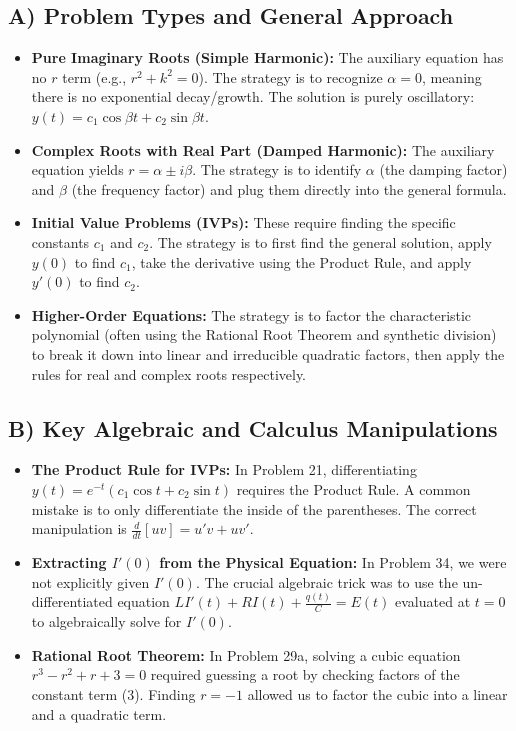 \documentclass[11pt]{article}
\begin{document}
\subsection{A) Problem Types and General Approach}
\begin{itemize}
    \item \textbf{Pure Imaginary Roots (Simple Harmonic):} The auxiliary equation has no $r$ term (e.g., $r^2 + k^2 = 0$). The strategy is to recognize $\alpha = 0$, meaning there is no exponential decay/growth. The solution is purely oscillatory: $y(t) = c_1 \cos \beta t + c_2 \sin \beta t$.
    \item \textbf{Complex Roots with Real Part (Damped Harmonic):} The auxiliary equation yields $r = \alpha \pm i\beta$. The strategy is to identify $\alpha$ (the damping factor) and $\beta$ (the frequency factor) and plug them directly into the general formula.
    \item \textbf{Initial Value Problems (IVPs):} These require finding the specific constants $c_1$ and $c_2$. The strategy is to first find the general solution, apply $y(0)$ to find $c_1$, take the derivative using the Product Rule, and apply $y'(0)$ to find $c_2$.
    \item \textbf{Higher-Order Equations:} The strategy is to factor the characteristic polynomial (often using the Rational Root Theorem and synthetic division) to break it down into linear and irreducible quadratic factors, then apply the rules for real and complex roots respectively.
\end{itemize}

\subsection{B) Key Algebraic and Calculus Manipulations}
\begin{itemize}
    \item \textbf{The Product Rule for IVPs:} In Problem 21, differentiating $y(t) = e^{-t}(c_1 \cos t + c_2 \sin t)$ requires the Product Rule. A common mistake is to only differentiate the inside of the parentheses. The correct manipulation is $\frac{d}{dt}[uv] = u'v + uv'$.
    \item \textbf{Extracting $I'(0)$ from the Physical Equation:} In Problem 34, we were not explicitly given $I'(0)$. The crucial algebraic trick was to use the un-differentiated equation $L I'(t) + R I(t) + \frac{q(t)}{C} = E(t)$ evaluated at $t=0$ to algebraically solve for $I'(0)$.
    \item \textbf{Rational Root Theorem:} In Problem 29a, solving a cubic equation $r^3 - r^2 + r + 3 = 0$ required guessing a root by checking factors of the constant term (3). Finding $r=-1$ allowed us to factor the cubic into a linear and a quadratic term.
\end{itemize}
\end{document}
